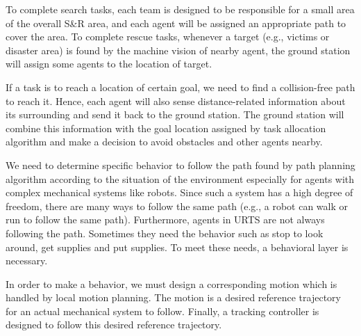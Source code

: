 \documentclass{ieeeaccess}
\begin{document}
To complete search tasks, each team is designed to be responsible for a small area of the overall S\&R area, and each agent will be assigned an appropriate path to cover the area. To complete rescue tasks, whenever a target (e.g., victims or disaster area) is found by the machine vision of nearby agent, the ground station will assign some agents to the location of target. 

If a task is to reach a location of certain goal, we need to find a collision-free path to reach it. 
Hence, each agent will also sense distance-related information about its surrounding and send it back to the ground station. The ground station will combine this information with the goal location assigned by task allocation algorithm and make a decision to avoid obstacles and other agents nearby.

We need to determine specific behavior to follow the path found by path planning algorithm according to the situation of the environment especially for agents with complex mechanical systems like robots. Since such a system has a high degree of freedom, there are many ways to follow the same path (e.g., a robot can walk or run to follow the same path). Furthermore, agents in URTS are not always following the path. Sometimes they need the behavior such as stop to look around, get supplies and put supplies. To meet these needs, a behavioral layer is necessary.

In order to make a behavior, we must design a corresponding motion which is handled by local motion planning. The motion is a desired reference trajectory for an actual mechanical system to follow. Finally, a tracking controller is designed to follow this desired reference trajectory.
\end{document}
